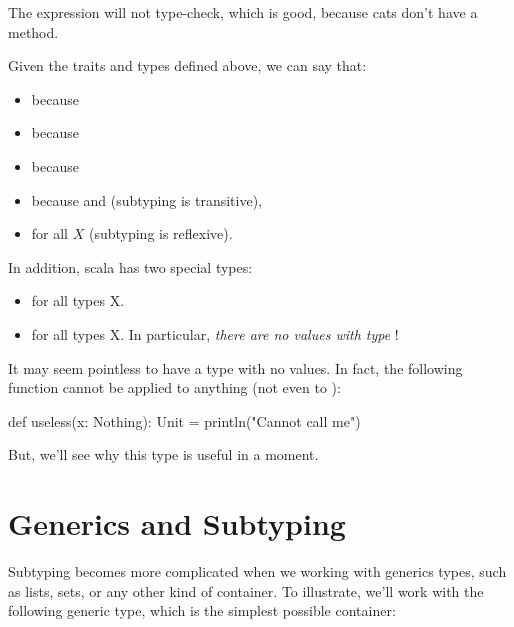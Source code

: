 \documentclass{book}
\begin{document}
The expression  will not type-check, which
is good, because cats don't have a  method.

Given the traits and types defined above, we can say that:
\begin{itemize}

  \item {} because 

  \item {} because 

  \item {} because 

  \item {} because  and
   (subtyping is transitive),

  \item {} for all $X$ (subtyping is reflexive).

\end{itemize}

In addition, scala has two special types:

\begin{itemize}

  \item {} for all types X.

  \item {} for all types X. In particular,
  \emph{there are no values with type }!

\end{itemize}

It may seem pointless to have a type with no values. In fact, the following
function cannot be applied to anything (not even to ):
\begin{scalacode}
def useless(x: Nothing): Unit = {
  println("Cannot call me")
}
\end{scalacode}

But, we'll see why this type is useful in a moment.

\section{Generics and Subtyping}

Subtyping becomes more complicated when we working with generics types, such
as lists, sets, or any other kind of container. To illustrate, we'll work
with the following generic type, which is the simplest possible container:
\end{document}
